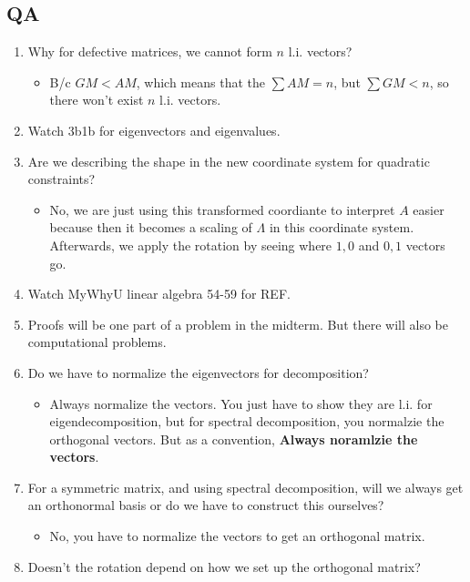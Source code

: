 \subsection{QA}
\begin{summary}
    \begin{enumerate}
        \item Why for defective matrices, we cannot form $n$ l.i. vectors?
        \begin{itemize}
            \item B/c $GM<AM$, which means that the $\sum AM =n $, but $\sum GM < n$, so there won't exist $n$ l.i. vectors.
        \end{itemize}
        \item Watch 3b1b for eigenvectors and eigenvalues. 
        \item Are we describing the shape in the new coordinate system for quadratic constraints? 
        \begin{itemize}
            \item No, we are just using this transformed coordiante to interpret $A$ easier because then it becomes a scaling of $\Lambda$ in this coordinate system. Afterwards, we apply the rotation by seeing where $1,0$ and $0,1$ vectors go. 
        \end{itemize}
        \item Watch MyWhyU linear algebra 54-59 for REF.
        \item Proofs will be one part of a problem in the midterm. But there will also be computational problems. 
        \item Do we have to normalize the eigenvectors for decomposition? 
        \begin{itemize}
            \item Always normalize the vectors. You just have to show they are l.i. for eigendecomposition, but for spectral decomposition, you normalzie the orthogonal vectors. But as a convention, \textbf{Always noramlzie the vectors}.
        \end{itemize}
        \item For a symmetric matrix, and using spectral decomposition, will we always get an orthonormal basis or do we have to construct this ourselves?
        \begin{itemize}
            \item No, you have to normalize the vectors to get an orthogonal matrix. 
        \end{itemize}
        \item Doesn't the rotation depend on how we set up the orthogonal matrix? 

\end{enumerate}
\end{summary}
